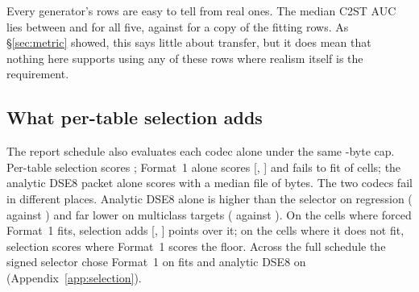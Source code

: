 \documentclass[10pt,letterpaper,twocolumn]{article}
\newcommand{\cli}[1]{{\ttfamily\fontsize{8.9}{11}\selectfont #1}}
\begin{document}
Every generator's rows are easy to tell from real ones. The median C2ST AUC lies between  and  for all five, against  for a copy of the fitting rows. As \S\ref{sec:metric} showed, this says little about transfer, but it does mean that nothing here supports using any of these rows where realism itself is the requirement.

\subsection{What per-table selection adds}
The report schedule also evaluates each codec alone under the same -byte cap. Per-table selection scores ; Format~1 alone scores  [, ] and fails to fit  of  cells; the analytic \cli{DSE8} packet alone scores  with a median file of  bytes. The two codecs fail in different places. Analytic \cli{DSE8} alone is higher than the selector on regression ( against ) and far lower on multiclass targets ( against ). On the cells where forced Format~1 fits, selection adds  [, ] points over it; on the cells where it does not fit, selection scores  where Format~1 scores the floor. Across the full schedule the signed selector chose Format~1 on  fits and analytic \cli{DSE8} on  (Appendix~\ref{app:selection}).
\end{document}
